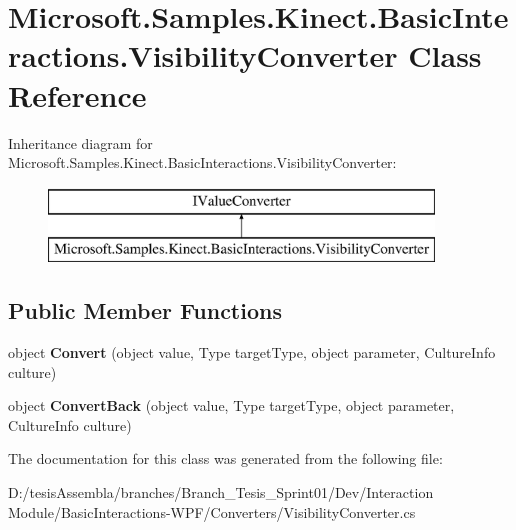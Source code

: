 \hypertarget{class_microsoft_1_1_samples_1_1_kinect_1_1_basic_interactions_1_1_visibility_converter}{\section{Microsoft.\-Samples.\-Kinect.\-Basic\-Interactions.\-Visibility\-Converter Class Reference}
\label{class_microsoft_1_1_samples_1_1_kinect_1_1_basic_interactions_1_1_visibility_converter}
}
Inheritance diagram for Microsoft.\-Samples.\-Kinect.\-Basic\-Interactions.\-Visibility\-Converter\-:\begin{figure}[H]
\begin{center}
\leavevmode
\includegraphics[height=2.000000cm]{class_microsoft_1_1_samples_1_1_kinect_1_1_basic_interactions_1_1_visibility_converter}
\end{center}
\end{figure}
\subsection*{Public Member Functions}
\begin{DoxyCompactItemize}
\item 
\hypertarget{class_microsoft_1_1_samples_1_1_kinect_1_1_basic_interactions_1_1_visibility_converter_a753663bff7ffbeb0eb173d7e65783788}{object {\bfseries Convert} (object value, Type target\-Type, object parameter, Culture\-Info culture)}\label{class_microsoft_1_1_samples_1_1_kinect_1_1_basic_interactions_1_1_visibility_converter_a753663bff7ffbeb0eb173d7e65783788}

\item 
\hypertarget{class_microsoft_1_1_samples_1_1_kinect_1_1_basic_interactions_1_1_visibility_converter_ac99984bb53ead2d4c9d2812dea99a170}{object {\bfseries Convert\-Back} (object value, Type target\-Type, object parameter, Culture\-Info culture)}\label{class_microsoft_1_1_samples_1_1_kinect_1_1_basic_interactions_1_1_visibility_converter_ac99984bb53ead2d4c9d2812dea99a170}

\end{DoxyCompactItemize}


The documentation for this class was generated from the following file\-:\begin{DoxyCompactItemize}
\item 
D\-:/tesis\-Assembla/branches/\-Branch\-\_\-\-Tesis\-\_\-\-Sprint01/\-Dev/\-Interaction Module/\-Basic\-Interactions-\/\-W\-P\-F/\-Converters/Visibility\-Converter.\-cs\end{DoxyCompactItemize}

